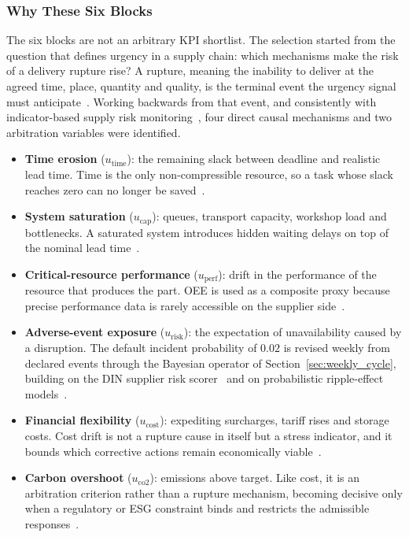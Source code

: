 \subsubsection{Why These Six Blocks}
\label{sec:model_blocks}

The six blocks are not an arbitrary KPI shortlist. The selection started from the question
that defines urgency in a supply chain: which mechanisms make the risk of a delivery
rupture rise? A rupture, meaning the inability to deliver at the agreed time, place,
quantity and quality, is the terminal event the urgency signal must
anticipate~\autocite{heckmann2015critical}. Working backwards from that event, and
consistently with indicator-based supply risk monitoring~\autocite{mokhtar2019supplier},
four direct causal mechanisms and two arbitration variables were identified.

\begin{itemize}
    \item \textbf{Time erosion} ($u_{\text{time}}$): the remaining slack between deadline
    and realistic lead time. Time is the only non-compressible resource, so a task whose
    slack reaches zero can no longer be
    saved~\autocite{cohen2021assigning,bojarski2021,sun2020combating,sawik2013integrated}.
    \item \textbf{System saturation} ($u_{\text{cap}}$): queues, transport capacity,
    workshop load and bottlenecks. A saturated system introduces hidden waiting delays on
    top of the nominal lead
    time~\autocite{tomlin2006value,hosseini2019resilient,taghavi2024sustainable}.
    \item \textbf{Critical-resource performance} ($u_{\text{perf}}$): drift in the
    performance of the resource that produces the part. OEE is used as a composite proxy
    because precise performance data is rarely accessible on the supplier
    side~\autocite{mokhtar2019supplier,hlioui2017joint}.
    \item \textbf{Adverse-event exposure} ($u_{\text{risk}}$): the expectation of
    unavailability caused by a disruption. The default incident probability of $0.02$ is
    revised weekly from declared events through the Bayesian operator of
    Section~\ref{sec:weekly_cycle}, building on the DIN supplier risk
    scorer~\autocite{kabouche2025scoring} and on probabilistic ripple-effect
    models~\autocite{hosseini2020ripple,liu2021robust,hosseini2020bayesian}.
    \item \textbf{Financial flexibility} ($u_{\text{cost}}$): expediting surcharges, tariff
    rises and storage costs. Cost drift is not a rupture cause in itself but a stress
    indicator, and it bounds which corrective actions remain economically
    viable~\autocite{shen2019managing,tomlin2006value}.
    \item \textbf{Carbon overshoot} ($u_{\text{co2}}$): emissions above target. Like cost,
    it is an arbitration criterion rather than a rupture mechanism, becoming decisive only
    when a regulatory or ESG constraint binds and restricts the admissible
    responses~\autocite{hoen2014effect,smartfreight2023glec,iso14083}.
\end{itemize}

